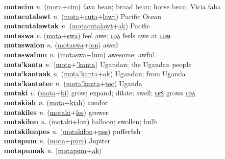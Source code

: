 \textbf{motacim} \textit{n.} (\hyperref[mota]{mota}+\hyperref[cim]{cim})
fava bean; broad bean; horse bean; Vicia faba \label{motacim} \\
\textbf{motacutalawt} \textit{n.} (\hyperref[mota]{mota}+\hyperref[cuta]{cuta}+\hyperref[lawt]{lawt})
Pacific Ocean \label{motacutalawt} \\
\textbf{motacutalawtak} \textit{n.} (\hyperref[motacutalawt]{motacutalawt}+\hyperref[ak]{ak})
Pacific \label{motacutalawtak} \\
\textbf{motaswa} \textit{v.} (\hyperref[mota]{mota}+\hyperref[swa]{swa})
feel awe; \hyperref[motaswalon]{ʟᴏᴧ} feels awe at \hyperref[motaswalum]{ʟᴜᴍ} \label{motaswa} \\
\textbf{motaswalon} \textit{n.} (\hyperref[motaswa]{motaswa}+\hyperref[lon]{lon})
awed \label{motaswalon} \\
\textbf{motaswalum} \textit{n.} (\hyperref[motaswa]{motaswa}+\hyperref[lum]{lum})
awesome; awful \label{motaswalum} \\
\textbf{mota'kanta} \textit{n.} (\hyperref[mota]{mota}+\hyperref['kanta]{'kanta})
Ugandan; the Ugandan people \label{mota'kanta} \\
\textbf{mota'kantaak} \textit{n.} (\hyperref[mota'kanta]{mota'kanta}+\hyperref[ak]{ak})
Ugandan; from Uganda \label{mota'kantaak} \\
\textbf{mota'kantatec} \textit{n.} (\hyperref[mota'kanta]{mota'kanta}+\hyperref[tec]{tec})
Uganda \label{mota'kantatec} \\
\textbf{motaki} \textit{v.} (\hyperref[mota]{mota}+\hyperref[ki]{ki})
grow; expand; dilate; swell; \hyperref[motakiles]{ʟєꜱ} grows \hyperref[motakilon]{ʟᴏᴧ} \label{motaki} \\
\textbf{motakiah} \textit{n.} (\hyperref[mota]{mota}+\hyperref[kiah]{kiah})
condor \label{motakiah} \\
\textbf{motakiles} \textit{n.} (\hyperref[motaki]{motaki}+\hyperref[les]{les})
grower \label{motakiles} \\
\textbf{motakilon} \textit{n.} (\hyperref[motaki]{motaki}+\hyperref[lon]{lon})
balloon; swollen; bulb \label{motakilon} \\
\textbf{motakilonpes} \textit{n.} (\hyperref[motakilon]{motakilon}+\hyperref[pes]{pes})
pufferfish \label{motakilonpes} \\
\textbf{motapum} \textit{n.} (\hyperref[mota]{mota}+\hyperref[pum]{pum})
Jupiter \label{motapum} \\
\textbf{motapumak} \textit{n.} (\hyperref[motapum]{motapum}+\hyperref[ak]{ak})

